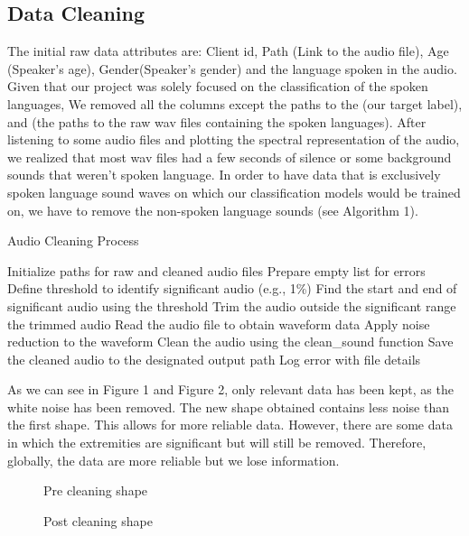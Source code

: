 \documentclass[twocolumn]{article}
\begin{document}
\subsection{Data Cleaning}
The initial raw data attributes are: Client id, Path (Link to the audio file), Age (Speaker's age), Gender(Speaker's gender) and the language spoken in the audio.\\

Given that our project was solely focused on the classification of the spoken languages, We removed all the columns except the paths to the  (our target label), and  (the paths to the raw wav files containing the spoken languages). After listening to some audio files and plotting the spectral representation of the audio, we realized that most wav files had a few seconds of silence or some background sounds that weren't spoken language. In order to have data that is exclusively spoken language sound waves on which our classification models would be trained on, we have to remove the non-spoken language sounds (see Algorithm 1).  
\begin{algorithm}
\caption{Audio Cleaning Process}
\begin{algorithmic}[1]
\State Initialize paths for raw and cleaned audio files
\State Prepare empty list for errors
    \State Define threshold to identify significant audio (e.g., 1\%)
    \State Find the start and end of significant audio using the threshold
    \State Trim the audio outside the significant range
    \State \Return the trimmed audio
\EndFunction
{}
        \State Read the audio file to obtain waveform data
        \State Apply noise reduction to the waveform
            \State Clean the audio using the clean\_sound function
            \State Save the cleaned audio to the designated output path
            \State Log error with file details
        \EndIf
\EndFor
\end{algorithmic}
\end{algorithm}

As we can see in Figure 1 and Figure 2, only relevant data has been kept, as the white noise has been removed. The new shape obtained contains less noise than the first shape. This allows for more reliable data. However, there are some data in which the extremities are significant but will still be removed. Therefore, globally, the data are more reliable but we lose information.\\
\begin{figure}[!tbp]
  \centering
  \begin{minipage}[b]{0.4\textwidth}
    
    \caption{Pre cleaning shape}
  \end{minipage}
  \hfill
  \begin{minipage}[b]{0.4\textwidth}
    
    \caption{Post cleaning shape}
  \end{minipage}
\end{figure}
\end{document}
